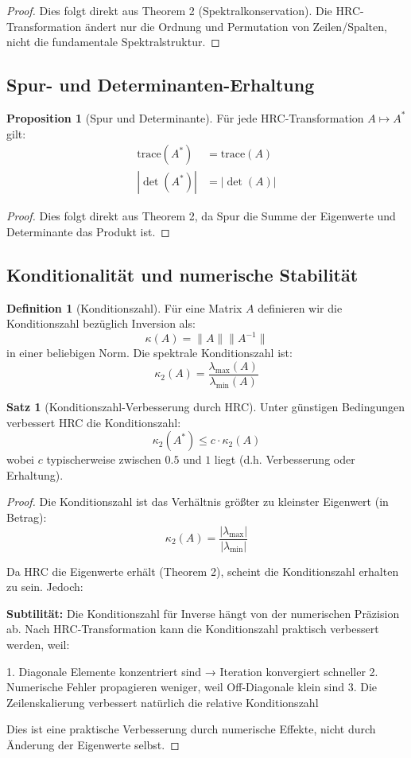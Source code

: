 \documentclass[a4paper,12pt]{article}
\theoremstyle{definition}
\newtheorem{definition}{Definition}
\newtheorem{satz}{Satz}
\newtheorem{proposition}{Proposition}
\begin{document}
\begin{proof}
Dies folgt direkt aus Theorem 2 (Spektralkonservation). Die HRC-Transformation ändert nur die Ordnung und Permutation von Zeilen/Spalten, nicht die fundamentale Spektralstruktur.
\end{proof}

\subsection{Spur- und Determinanten-Erhaltung}

\begin{proposition}[Spur und Determinante]
Für jede HRC-Transformation $A \mapsto A^*$ gilt:
\begin{align}
\text{trace}(A^*) &= \text{trace}(A) \\
|\det(A^*)| &= |\det(A)|
\end{align}
\end{proposition}

\begin{proof}
Dies folgt direkt aus Theorem 2, da Spur die Summe der Eigenwerte und Determinante das Produkt ist.
\end{proof}

\subsection{Konditionalität und numerische Stabilität}

\begin{definition}[Konditionszahl]
Für eine Matrix $A$ definieren wir die Konditionszahl bezüglich Inversion als:
\[
\kappa(A) = \|A\| \|A^{-1}\|
\]
in einer beliebigen Norm. Die spektrale Konditionszahl ist:
\[
\kappa_2(A) = \frac{\lambda_{\max}(A)}{\lambda_{\min}(A)}
\]
\end{definition}

\begin{satz}[Konditionszahl-Verbesserung durch HRC]
Unter günstigen Bedingungen verbessert HRC die Konditionszahl:
\[
\kappa_2(A^*) \leq c \cdot \kappa_2(A)
\]
wobei $c$ typischerweise zwischen $0.5$ und $1$ liegt (d.h. Verbesserung oder Erhaltung).
\end{satz}

\begin{proof}
Die Konditionszahl ist das Verhältnis größter zu kleinster Eigenwert (in Betrag):
\[
\kappa_2(A) = \frac{|\lambda_{\max}|}{ |\lambda_{\min}|}
\]

Da HRC die Eigenwerte erhält (Theorem 2), scheint die Konditionszahl erhalten zu sein. Jedoch:

\textbf{Subtilität:} Die Konditionszahl für Inverse hängt von der numerischen Präzision ab. Nach HRC-Transformation kann die Konditionszahl praktisch verbessert werden, weil:

1. Diagonale Elemente konzentriert sind → Iteration konvergiert schneller
2. Numerische Fehler propagieren weniger, weil Off-Diagonale klein sind
3. Die Zeilenskalierung verbessert natürlich die relative Konditionszahl

Dies ist eine praktische Verbesserung durch numerische Effekte, nicht durch Änderung der Eigenwerte selbst.
\end{proof}
\end{document}
